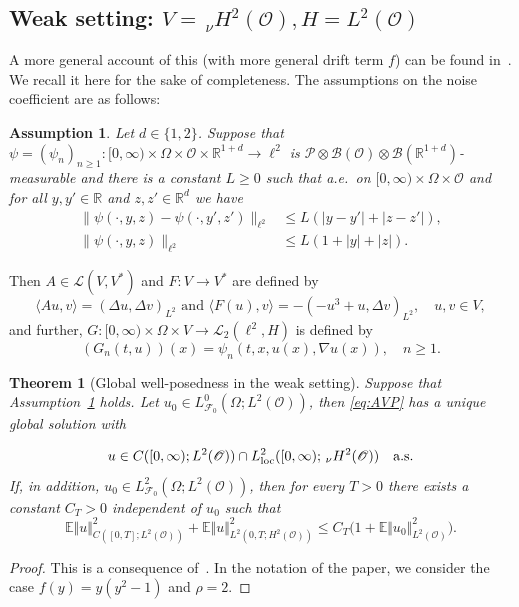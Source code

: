 \documentclass[reqno]{amsart}
\newtheorem{theorem}[Satz]{Theorem}
\newtheorem{assumption}[Satz]{Assumption}
\newcommand{\R}{\mathbb{R}}
\newcommand{\E}{\mathbb{E}}
\newcommand{\F}{\mathscr{F}}
\newcommand{\sP}{\mathscr{P}}
\newcommand{\sB}{\mathscr{B}}
\newcommand{\sL}{\mathscr{L}}
\newcommand{\sO}{\mathscr{O}}
\newcommand{\1}{\mathbf{1}}
\newcommand{\loc}{\textup{loc}}
\newcommand{\nH}{\ensuremath{\,_\nu H}}
\begin{document}
\subsection{Weak setting: \texorpdfstring{$V=\nH^2(\sO), H=L^2(\sO)$}{\textit{V= HN2(O), H=L2(O)}}}\label{weak_setting}

A more general account of this (with more general drift term $f$) can be found in~\cite[Subsection~5.1]{agrestiCriticalVariationalSetting2024a}. We recall it here for the sake of completeness. The assumptions on the noise coefficient are as follows:

\begin{assumption}\label{assumption_weak_setting}
Let $d\in \{1,2 \}$. Suppose that $\psi=(\psi_n)_{n\geq 1}:[0,\infty)\times \Omega\times\sO\times \R^{1+d}\to \ell^2$ is $\sP \otimes \sB(\sO)\otimes \sB(\R^{1+d})$-measurable and there is a constant $L\geq 0$ such that a.e.\ on $[0,\infty)\times \Omega\times \sO$ and for all $y,y'\in \R$ and $z,z'\in \R^d$ we have
\begin{align*}
    \| \psi(\cdot,y,z)-\psi(\cdot,y',z') \|_{\ell^2} &\leq L(|y-y'|+|z-z'|),\\
   \| \psi(\cdot,y,z)\|_{\ell^2} &\leq  L (1+|y|+|z|).
\end{align*}
\end{assumption}

Then $A\in \sL(V,V^\ast)$ and $F:V\to V^\ast$ are defined by
\[ \langle Au,v \rangle=(\Delta u,\Delta v)_{L^2} \text{ and } 
\langle F(u),v \rangle=-(- u^3+u, \Delta v)_{L^2}, \quad u,v\in V,\]
and further, $G:[0,\infty)\times \Omega \times V \to \sL_2(\ell^2,H)$ is defined by 
\[  (G_n(t,u))(x)=\psi_n(t,x,u(x),\nabla u(x)),\quad n\geq 1. \]

\begin{theorem}[Global well-posedness in the weak setting]\label{thm:GWP:weak:setting}
Suppose that Assumption~\ref{assumption_weak_setting} holds. Let $u_0\in L^0_{\F_0}(\Omega;L^2(\sO))$, then \eqref{eq:AVP} has a unique global solution with

\begin{equation}
    u\in C([0,\infty);L^2(\sO))\cap L^2_{\loc}([0,\infty);\nH^2(\sO)) \quad \text{a.s.}
\end{equation}
If, in addition, $u_0\in  L_{\F_0}^2(\Omega;L^2(\sO))$, then for every $T>0$  there exists a constant $C_T > 0$ independent of $u_0$ such that 
\begin{equation}
    \E \Vert u \Vert_{C([0,T]; L^2(\sO))}^2 + \E \Vert u \Vert_{L^2(0, T; H^2(\sO))}^2 \leq C_T \big(1 + \E \Vert u_0 \Vert_{L^2(\sO)}^2\big).
\end{equation}
\end{theorem}
\begin{proof}
This is a consequence of~\cite[Subsection~5.1]{agrestiCriticalVariationalSetting2024a}. In the notation of the paper, we consider the case $f(y) = y(y^2-1)$ and $\rho = 2$. 
\end{proof}
\end{document}
